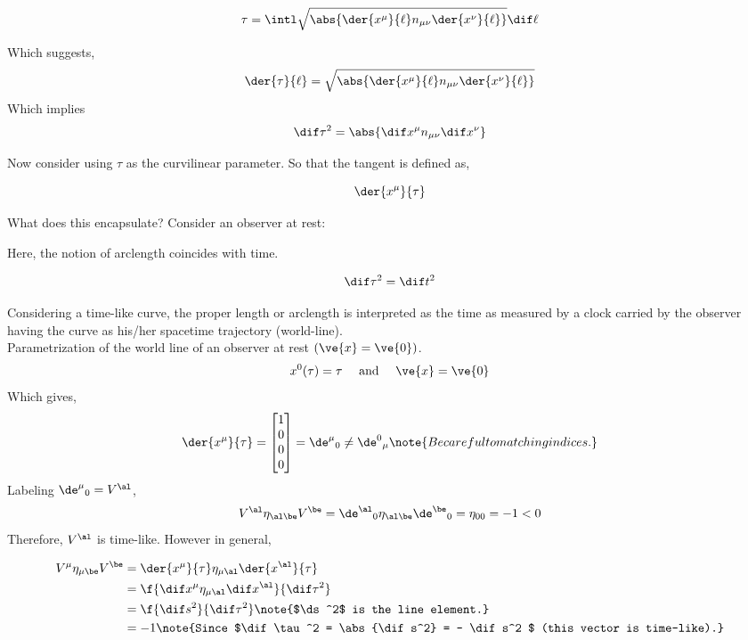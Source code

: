 \documentclass{article}
\newcommand{\mtrx}[1]{
    \begin{bmatrix}
    #1
    \end{bmatrix}
}
\begin{document}
\[ \tau = \intl \sqrt{\abs{\der{x^\mu}{\ell} n_{\mu\nu} \der{x^\nu}{\ell}}} \dif \ell \]

Which suggests,
\[ \der{\tau}{\ell} = \sqrt{\abs{\der{x^\mu}{\ell} n_{\mu\nu} \der{x^\nu}{\ell}}} \]
Which implies
\[ \dif \tau ^2 = \abs{\dif x^\mu n_{\mu\nu} \dif x^\nu} \]

Now consider using $\tau$ as the curvilinear parameter. So that the tangent is defined as,

\[ \der{x^\mu}{\tau} \]

What does this encapsulate? Consider an observer at rest:

\begin{center}
\end{center}

Here, the notion of arclength coincides with time.

\[ \dif \tau^2 = \dif t^2 \]

Considering a time-like curve, the proper length or arclength is interpreted as the time as measured by a clock carried by the observer having the curve as his/her spacetime trajectory (world-line). \\

Parametrization of the world line of an observer at rest $(\ve{x} = \ve{0})$.
\[ x^0(\tau) = \tau \quad \text{ and } \quad \ve{x} = \ve{0} \]
Which gives,
\[ \der{x^\mu}{\tau} = \mtrx{1 \\ 0 \\ 0 \\ 0} = {\de^\mu}_0 \neq {\de^0}_\mu \note{Be careful to matching indices.} \]
Labeling ${\de^\mu}_0 = V^\al$,
\[ V^\al \eta_{\al\be} V^\be = {\de^\al}_0 \eta_{\al\be} {\de^\be}_0 = \eta_{00}= -1 < 0  \]
Therefore, $V^\al$ is time-like. However in general,

\begin{align*}
V^\mu \eta_{\mu\be} V^\be &= \der{x^\mu}{\tau}  \eta_{\mu\al} \der{x^\al}{\tau}\\
&= \f{\dif x^\mu\eta_{\mu\al} \dif x^\al}{\dif \tau^2}\\
&= \f{\dif s^2}{\dif \tau^2} \note{$\ds^2$ is the line element.}\\
&= -1 \note{Since $\dif \tau^2 = \abs{\dif s^2} = - \dif s^2 $ (this vector is time-like).}\\
\end{align*}
\end{document}
